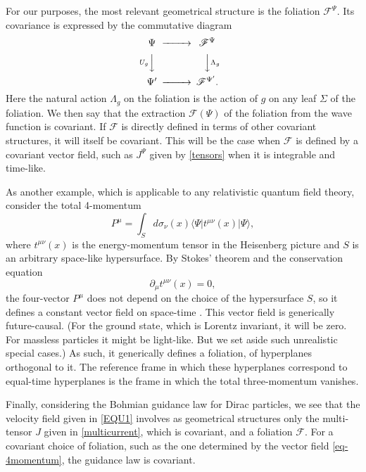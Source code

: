 \documentclass[12pt]{article}
\begin{document}
For our purposes, the most relevant geometrical structure is 
the foliation $
{\mathscr{F}}^\Psi$. Its covariance is expressed by the commutative  diagram
\begin{equation}
 \CD
\Psi{}    @>>>    {\mathscr{F}}^\Psi{}\\
@VU_gVV         @VV \Lambda_g V\\
\Psi{}'  @>>>    {\mathscr{F}}^{\Psi{}'} .
\endCD
\end{equation}
Here the natural action $ \Lambda_g$ on the foliation is the action of
$g$ on any leaf $\Sigma$ of the foliation.  We then say that the extraction $\mathscr{F}(\Psi)$ of the foliation from the wave function is covariant. If ${\mathscr{F}}$ is directly defined in terms of other covariant structures, it will itself be covariant. This will be the case when $\mathscr{F}$ 
is defined by a covariant vector field, such as 
$J^\Psi$  given by 
\eqref{tensors}  when it is integrable and time-like. 


As another example, which is applicable to any relativistic quantum field theory, consider the total 4-momentum
\begin{equation}
P^\mu =  \int_S d\sigma_\nu(x)  \langle \Psi | t^{\mu \nu}(x) | \Psi \rangle,
\label{eq-4momentum}
\end{equation}
where $t^{\mu \nu}(x)$ is the energy-momentum tensor in the Heisenberg picture and $S$ is an arbitrary space-like hypersurface. By Stokes' theorem and the conservation equation 
\begin{equation}\label{conserv}
\partial_\mu t^{\mu \nu}(x)  = 0, 
\end{equation}
the four-vector $P^\mu$ does not depend on the choice of the
hypersurface $S$, so it defines a constant vector
field on space-time \cite{schweber61}. This vector field is generically
future-causal. (For the ground state, which is Lorentz invariant, it
will be zero. For massless particles it might be light-like.
But we set aside such unrealistic special cases.)
As such, it generically defines a foliation, of hyperplanes orthogonal to
it. The reference frame in which these hyperplanes correspond to
equal-time hyperplanes is the frame in which the total three-momentum
vanishes.



Finally, considering the Bohmian guidance law for Dirac particles, we see that the velocity field given in \eqref{EQU1} involves as geometrical structures only the multi-tensor $J$ given in \eqref{multicurrent}, which is covariant, and a foliation $\mathscr{F}$. For a covariant choice of foliation, such as the one determined by the vector field \eqref{eq-4momentum}, the guidance law is covariant. 
\end{document}
